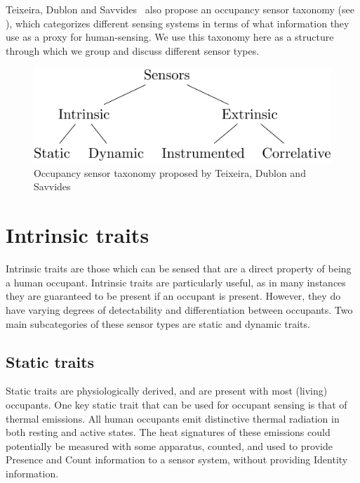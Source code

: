 \documentclass[../thesis/thesis.tex]{subfiles}
\begin{document}
Teixeira, Dublon and Savvides~\cite{teixeira2010survey} also propose an occupancy sensor taxonomy (see ), which categorizes different sensing systems in terms of what information they use as a proxy for human-sensing. We use this taxonomy here as a structure through which we group and discuss different sensor types.

\begin{figure}
\centering
\includegraphics{../diagrams/category-tree.pdf}
\caption{Occupancy sensor taxonomy proposed by Teixeira, Dublon and Savvides~\cite{teixeira2010survey}}
\label{fig:litreview:taxonomy}
\end{figure}

\section{Intrinsic traits}
\label{subsec:litreview:sensors:intrinsic}

Intrinsic traits are those which can be sensed that are a direct property of being a human occupant. Intrinsic traits are particularly useful, as in many instances they are guaranteed to be present if an occupant is present. However, they do have varying degrees of detectability and differentiation between occupants. Two main subcategories of these sensor types are static and dynamic traits.

\subsection{Static traits}
\label{subsubsec:litreview:sensors:intrinsic:static}
Static traits are physiologically derived, and are present with most (living) occupants. One key static trait that can be used for occupant sensing is that of thermal emissions. All human occupants emit distinctive thermal radiation in both resting and active states. The heat signatures of these emissions could potentially be measured with some apparatus, counted, and used to provide Presence and Count information to a sensor system, without providing Identity information.
\end{document}
